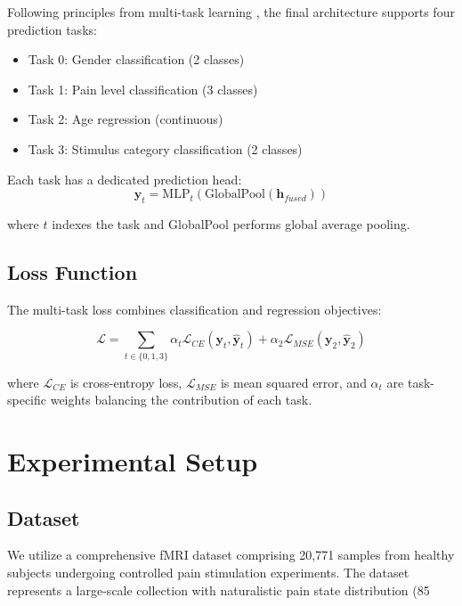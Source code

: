 \documentclass[10pt,journal,compsoc]{IEEEtran}
\begin{document}
Following principles from multi-task learning \cite{caruana1997multitask,ruder2017overview}, the final architecture supports four prediction tasks:
\begin{itemize}
\item Task 0: Gender classification (2 classes)
\item Task 1: Pain level classification (3 classes)  
\item Task 2: Age regression (continuous)
\item Task 3: Stimulus category classification (2 classes)
\end{itemize}

Each task has a dedicated prediction head:
\begin{equation}
\mathbf{y}_t = \text{MLP}_t(\text{GlobalPool}(\mathbf{h}_{fused}))
\end{equation}

where $t$ indexes the task and GlobalPool performs global average pooling.

\subsection{Loss Function}

The multi-task loss combines classification and regression objectives:

\begin{equation}
\mathcal{L} = \sum_{t \in \{0,1,3\}} \alpha_t \mathcal{L}_{CE}(\mathbf{y}_t, \hat{\mathbf{y}}_t) + \alpha_2 \mathcal{L}_{MSE}(\mathbf{y}_2, \hat{\mathbf{y}}_2)
\end{equation}

where $\mathcal{L}_{CE}$ is cross-entropy loss, $\mathcal{L}_{MSE}$ is mean squared error, and $\alpha_t$ are task-specific weights balancing the contribution of each task.

\section{Experimental Setup}

\subsection{Dataset}

We utilize a comprehensive fMRI dataset comprising 20,771 samples from healthy subjects undergoing controlled pain stimulation experiments. The dataset represents a large-scale collection with naturalistic pain state distribution (85%
\end{document}

